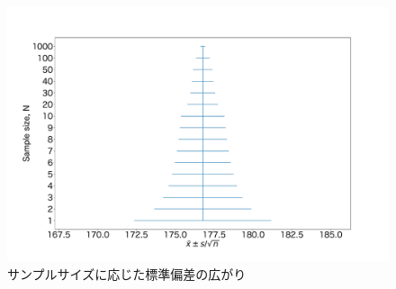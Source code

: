 \begin{figure}
    \begin{center}
        \includegraphics[width=15cm]{./image/10_/Norm_SE.pdf}
        \caption{サンプルサイズに応じた標準偏差の広がり}
    \end{center}
\end{figure}

